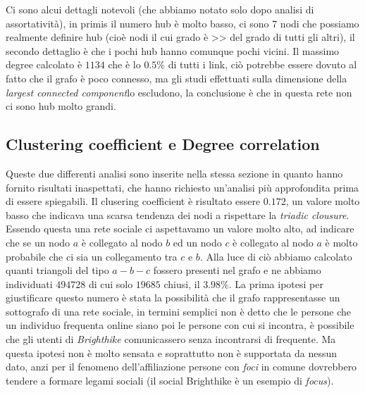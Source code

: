 \documentclass[a4paper]{article}
\newcommand{\lcc}{\textit{largest connected component}}
\begin{document}
Ci sono alcui dettagli notevoli (che abbiamo notato solo dopo analisi di assortatività), in primis il numero hub è molto basso, ci sono 7 nodi che possiamo realmente definire hub (cioè nodi il cui grado è >> del grado di tutti gli altri), il secondo dettaglio è che i pochi hub hanno comunque pochi vicini.
Il massimo degree calcolato è $1134$ che è lo $0.5\%$ di tutti i link, ciò potrebbe essere dovuto al fatto che il grafo è poco connesso, ma gli studi effettuati sulla dimensione della \lcc lo escludono, la conclusione è che in questa rete non ci sono hub molto grandi.
\subsection{Clustering coefficient e Degree correlation}
Queste due differenti analisi sono inserite nella stessa sezione in quanto hanno fornito risultati inaspettati, che hanno richiesto un'analisi più approfondita prima di essere spiegabili.
Il clusering coefficient è risultato essere $0.172$, un valore molto basso che indicava una scarsa tendenza dei nodi a rispettare la \textit{triadic clousure}.
Essendo questa una rete sociale ci aspettavamo un valore molto alto, ad indicare che se un nodo $a$ è collegato al nodo $b$ ed un nodo $c$ è collegato al nodo $a$ è molto probabile che ci sia un collegamento tra $c$ e $b$.
Alla luce di ciò abbiamo calcolato quanti triangoli del tipo $a - b - c$ fossero presenti nel grafo e ne abbiamo individuati $494728$ di cui solo $19685$ chiusi, il $3.98\%$.
La prima ipotesi per giustificare questo numero è stata la possibilità che il grafo rappresentasse un sottografo di una rete sociale, in termini semplici non è detto che le persone che un individuo frequenta online siano poi le persone con cui si incontra, è possibile che gli utenti di \textit{Brighthike} comunicassero senza incontrarsi di frequente.
Ma questa ipotesi non è molto sensata e soprattutto non è supportata da nessun dato, anzi per il fenomeno dell'affiliazione persone con \textit{foci} in comune dovrebbero tendere a formare legami sociali (il social Brighthike è un esempio di \textit{focus}).
\end{document}
